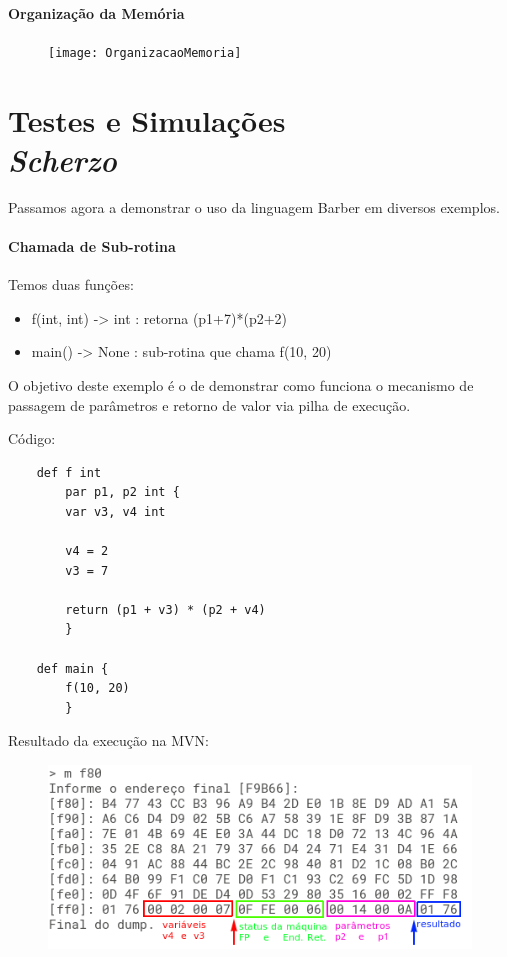 \documentclass[a4paper,12pt]{report}
\begin{document}
    \subsection*{Organização da Memória}
    \begin{figure}[h]
        \centering
        \texttt{[image: OrganizacaoMemoria]}
    \end{figure}

    \part*{Testes e Simulações\\\textit{Scherzo}}
    Passamos agora a demonstrar o uso da linguagem Barber em diversos exemplos.
    
    \subsection*{Chamada de Sub-rotina}
    Temos duas funções:
    \begin{itemize}
        \item f(int, int) -> int : retorna (p1+7)*(p2+2)
        \item main() -> None : sub-rotina que chama f(10, 20)
    \end{itemize}
    O objetivo deste exemplo é o de demonstrar como funciona o mecanismo de passagem de parâmetros e retorno de valor via pilha de execução.

    Código:
    \begin{lstlisting}
    def f int 
        par p1, p2 int {
        var v3, v4 int

        v4 = 2
        v3 = 7

        return (p1 + v3) * (p2 + v4)
        }

    def main {
        f(10, 20)
        }
    \end{lstlisting}
    Resultado da execução na MVN:
    \begin{figure}[h]
        \centering
        \includegraphics[scale=0.65]{chamada_subrotina}
    \end{figure}
\end{document}
